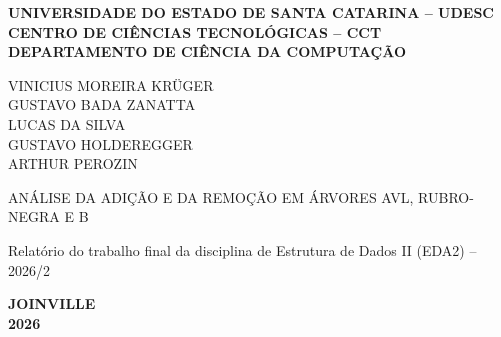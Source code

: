 \begin{titlingpage}
\thispagestyle{empty}
\begin{center}
\bfseries
UNIVERSIDADE DO ESTADO DE SANTA CATARINA -- UDESC\\
CENTRO DE CIÊNCIAS TECNOLÓGICAS -- CCT\\
DEPARTAMENTO DE CIÊNCIA DA COMPUTAÇÃO

\vspace*{3.1cm}
VINICIUS MOREIRA KRÜGER\\
GUSTAVO BADA ZANATTA\\
LUCAS DA SILVA\\
GUSTAVO HOLDEREGGER\\
ARTHUR PEROZIN

\vspace*{3.2cm}
ANÁLISE DA ADIÇÃO E DA REMOÇÃO EM ÁRVORES AVL, RUBRO-NEGRA E B

\vspace{0.6cm}
\normalfont
Relatório do trabalho final da disciplina de Estrutura de Dados II (EDA2) -- 2026/2

\vfill
\bfseries
JOINVILLE\\
2026
\end{center}
\end{titlingpage}
